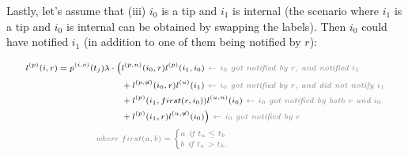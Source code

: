 \documentclass[a4paper,10pt]{article}
\begin{document}
Lastly, let's assume that (iii) $i_0$ is a tip and $i_1$ is internal (the scenario where $i_1$ is a tip and $i_0$ is internal can be obtained by swapping the labels). Then $i_0$ could have notified $i_1$ (in addition to one of them being notified by $r$):


\begin{equation}
\scriptsize
\begin{split}
l^{(p)}(i, r) = p^{(i,o)}(t_j) \lambda \cdot
\Big(&l^{(p,n)}(i_0,r)l^{(p)}(i_1,i_0) \textit{\color{gray}~$\leftarrow$ $i_0$ got notified by $r$, and notified $i_1$} \\
& + l^{(p,\not{n})}(i_0,r)l^{(u)}(i_1) \textit{\color{gray}~$\leftarrow$ $i_0$ got notified by $r$, and did not notify $i_1$} \\
& +l^{(p)}(i_1,first(r,i_0))l^{(u, n)}(i_0) \textit{\color{gray}~$\leftarrow$ $i_0$ got notified by both $r$ and $i_0$} \\
& + l^{(p)}(i_1,r)l^{(u, \not{n})}(i_0)\Big) \textit{\color{gray}~$\leftarrow$ $i_0$ got notified by $r$} \\
\textit{\color{gray}~where } &\color{gray}first(a,b) = 
\begin{cases}
a \textit{~if $t_a \leq t_b$}\\
b \textit{~if $t_a > t_b$.}
\end{cases} 
 \end{split}
\label{eq:lp-tip-int}
\end{equation}
\end{document}
